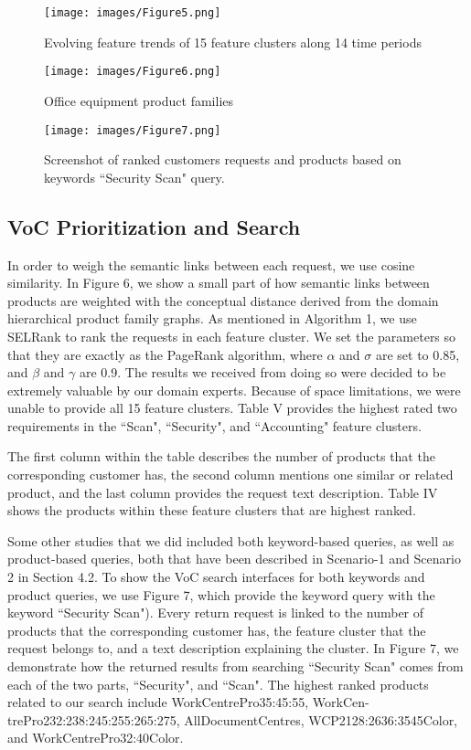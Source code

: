 \documentclass[sigconf]{acmart}
\begin{document}
\begin{figure*}[t!]
    \centering
    \texttt{[image: images/Figure5.png]}
    \caption{Evolving feature trends of 15 feature clusters along 14 time periods}
    \label{fig:5}
\end{figure*}


\begin{figure*}[t!]
    \centering
    \texttt{[image: images/Figure6.png]}
    \caption{Office equipment product families}
    \label{fig:6}
\end{figure*}

\begin{figure*}[t!]
    \centering
    \texttt{[image: images/Figure7.png]}
    \caption{Screenshot of ranked customers requests and products based on keywords ``Security Scan" query.}
    \label{fig:7}
\end{figure*}

\subsection{VoC Prioritization and Search}
In order to weigh the semantic links between each request, we use cosine similarity. In Figure 6, we show a small part of how semantic links between products are weighted with the conceptual distance derived from the domain hierarchical product family graphs. As mentioned in Algorithm 1, we use SELRank to rank the requests in each feature cluster. We set the parameters so that they are exactly as the PageRank algorithm, where $\alpha$ and $\sigma$ are set to 0.85, and $\beta$ and $\gamma$ are 0.9. The results we received from doing so were decided to be extremely valuable by our domain experts. Because of space limitations, we were unable to provide all 15 feature clusters. Table V provides the highest rated two requirements in the ``Scan", ``Security", and ``Accounting" feature clusters.

The first column within the table describes the number of products that the corresponding customer has, the second column mentions one similar or related product, and the last column provides the request text description. Table IV shows the products within these feature clusters that are highest ranked. 

Some other studies that we did included both keyword-based queries, as well as product-based queries, both that have been described in Scenario-1 and Scenario 2 in Section 4.2. To show the VoC search interfaces for both keywords and product queries, we use Figure 7, which provide the keyword query with the keyword ``Security Scan"). Every return request is linked to the number of products that the corresponding customer has, the feature cluster that the request belongs to, and a text description explaining the cluster. In Figure 7, we demonstrate how the returned results from searching ``Security Scan" comes from each of the two parts, ``Security", and ``Scan". The highest ranked products related to our search include WorkCentrePro35:45:55, WorkCen- trePro232:238:245:255:265:275, AllDocumentCentres, WCP2128:2636:3545Color, and WorkCentrePro32:40Color.
\end{document}
